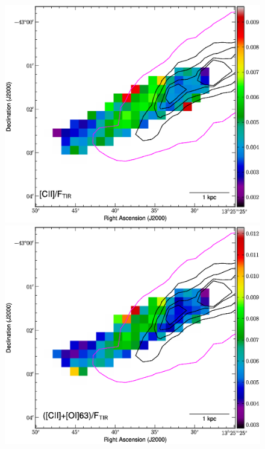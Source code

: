 \documentclass[preprint2]{aastex}
\begin{document}
\begin{figure}
\includegraphics[width=\columnwidth]{CenA_CIIonFtir_image_v1}
\includegraphics[width=\columnwidth]{CenA_CIIOI63onFtir_image_v1}

\end{figure}
\end{document}
